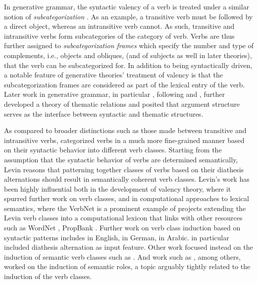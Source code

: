In generative grammar, the syntactic valency of a verb is treated under a similar notion of \textit{subcategorization} \citep{chomsky1965a}. As an example, a transitive verb must be followed by a direct object, whereas an intransitive verb cannot. As such, transitive and intransitive verbs form subcategories of the category of verb. Verbs are thus further assigned to \textit{subcategorization frames} which specify the number and type of complements, i.e., objects and obliques, (and of subjects as well in later theories), that the verb can be subcategorized for. In addition to being syntactically driven, a notable feature of generative theories' treatment of valency is that the subcategorization frames are considered as part of the lexical entry of the verb. Later work in generative grammar, in particular \citet{jackendoff1972,jackendoff1987,jackendoff1992}, following \citet{katz1963} and \citet{gruber1962}, further developed a theory of thematic relations and posited that argument structure serves as the interface between syntactic and thematic structures.

As compared to broader distinctions such as those made between transitive and intransitive verbs, \citet{levin1993} categorized verbs in a much more fine-grained manner based on their syntactic behavior into different verb classes. Starting from the assumption that the syntactic behavior of verbs are determined semantically, Levin reasons that patterning together classes of verbs based on their diathesis alternations should result in semantically coherent verb classes. Levin's work has been highly influential both in the development of valency theory, where it spurred further work on verb classes, and in computational approaches to lexical semantics, where the VerbNet \citep{kipper-schuler2005, kipper2006, kipper2008} is a prominent example of projects extending the Levin verb classes into a computational lexicon that links with other resources such as WordNet \citep{fellbaum1998, miller1995}, PropBank \citep{kingsbury2002}. Further work on verb class induction based on syntactic patterns includes \citet{basili1993, navarretta2000, korhonen2006, sun2008, sun2009,sun2013} in English, \citet{schulteimwalde2002, schulteimwalde2003, schulteimwalde2006} in German, \citet{snider2006} in Arabic. \citet{sun2013} in particular included diathesis alternation as input feature. Other work focused instead on the induction of semantic verb classes such as \citet{furstenau2012, majewska2018, majewska2020}. And work such as \citet{dowty1991, abend2009, titov2012, bickel2014, sayeed2018, watanabe2010, yamada2021}, among others, worked on the induction of semantic roles, a topic arguably tightly related to the induction of the verb classes.
 

